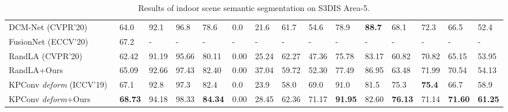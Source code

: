 \documentclass[final]{cvpr}
\begin{document}
\begin{table*}[thb]
\begin{footnotesize}
\begin{center}
\begin{tabular}{L{4.0cm} | C{1.0cm} | *{13}{C{0.92cm}}}
DCM-Net ({\color{blue}CVPR'20})~\cite{Schult_2020_CVPR} & 64.0 & 92.1 & 96.8 & 78.6 & 0.0 & 21.6 & 61.7 & 54.6 & 78.9 & \textbf{88.7} & 68.1 & 72.3 & 66.5 & 52.4 \Bstrut\\
FusionNet ({\color{blue}ECCV'20})~\cite{zhang2020deep} & 67.2 & - & - & - & - & - & - & - & - & - & - & - & - & -\\
\midrule
RandLA ({\color{blue}CVPR'20})~\cite{hu2020randla}	& 62.42	& 91.19	& 95.66	& 80.11	& 0.00	& 25.24	& 62.27	& 47.36	& 75.78	& 83.17	& 60.82	& 70.82	& 65.15	& 53.95\\
RandLA+Ours & 65.09 & 92.66 & 97.43 & 82.40 & 0.00 & 37.04 & 59.72 & 52.30 & 77.49 & 86.95 & 63.48 & 71.99 & 70.54 & 54.13 \Bstrut\\
\midrule
KPConv \textit{deform} ({\color{blue}ICCV'19})~\cite{thomas2019kpconv}	& 67.1	& 92.8	& 97.3	& 82.4	& 0.0	& 23.9	& 58.0	& 69.0	& 91.0	& 81.5	& 75.3	& \textbf{75.4}	& 66.7	& 58.9\\
KPConv \textit{deform}+Ours & \textbf{68.73} & 94.18 & 98.33 & \textbf{84.34} & 0.00 & 28.45 & 62.36 & 71.17 & \textbf{91.95} & 82.60 & \textbf{76.13} & 71.14 & \textbf{71.60} & \textbf{61.25} \Bstrut\\
\bottomrule
\end{tabular}
\end{center}
\end{footnotesize}
\caption{Results of indoor scene semantic segmentation on S3DIS Area-5.}
\label{tab:s3dis_supp} 
\end{table*}
\end{document}
